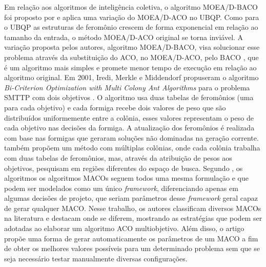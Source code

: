 Em relação aos algoritmos de inteligência coletiva, o algoritmo MOEA/D-BACO foi proposto por  e aplica uma variação do MOEA/D-ACO no \ac{UBQP}. Como para o UBQP as estruturas de feromônio crescem de forma exponencial em relação ao tamanho da entrada, o método MOEA/D-ACO original se torna inviável. A variação proposta pelos autores, algoritmo MOEA/D-BACO, visa solucionar esse problema através da substituição do ACO, no MOEA/D-ACO, pelo \ac{BACO} \cite{baco2006}, que é um algoritmo mais simples e promete menor tempo de execução em relação ao algoritmo original. Em 2001, Iredi, Merkle e Middendorf propuseram o algoritmo \textit{Bi-Criterion Optimization with Multi Colony Ant Algorithms} para o problema \ac{SMTTP} com dois objetivos \cite{BiCriterionAnt}. O algoritmo usa duas tabelas de feromônios (uma para cada objetivo) e cada formiga recebe dois valores de peso que são distribuídos uniformemente entre a colônia, esses valores representam o peso de cada objetivo nas decisões da formiga. A atualização dos feromônios é realizada com base nas formigas que geraram soluções não dominadas na geração corrente.  também propõem um método com múltiplas colônias, onde cada colônia trabalha com duas tabelas de feromônios, mas, através da atribuição de pesos aos objetivos, pesquisam em regiões diferentes do espaço de busca. Segundo , os algoritmos os algoritmos \acp{MACO} seguem todos uma mesma formulação e que podem ser modelados como um único \textit{framework}, diferenciando apenas em algumas decisões de projeto, que seriam parâmetros desse \textit{framework} geral capaz de gerar qualquer MACO. Nesse trabalho, os autores classificam diversos MACOs na literatura e destacam onde se diferem, mostrando as estratégias que podem ser adotadas ao elaborar um algoritmo ACO multiobjetivo. Além disso, o artigo propõe uma forma de gerar automaticamente os parâmetros de um MACO a fim de obter os melhores valores possíveis para um determinado problema sem que se seja necessário testar manualmente diversas configurações.